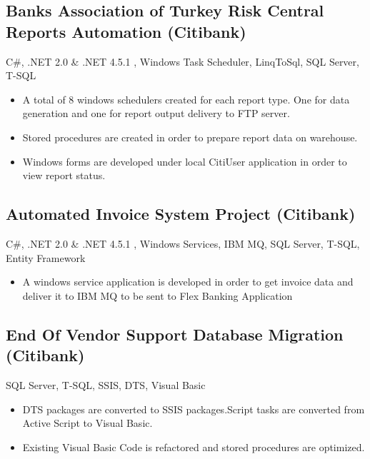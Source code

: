 \documentclass[1pt,a4paper,verdana]{moderncv} %
\begin{document}
\subsection{Banks Association of Turkey Risk Central Reports Automation (Citibank)}
 {C\#, .NET 2.0 \& .NET 4.5.1 , Windows Task Scheduler, LinqToSql, SQL Server, T-SQL}
 {\begin{itemize}
		\item A total of 8 windows schedulers created for each report type. One for data generation and one for report output delivery to FTP server.
		\item Stored procedures are created in order to prepare report data on warehouse.
		\item Windows forms are developed under local CitiUser application in order to view report status.
\end{itemize}}

\subsection{Automated Invoice System Project (Citibank)}
 {C\#, .NET 2.0 \& .NET 4.5.1 , Windows Services, IBM MQ, SQL Server, T-SQL, Entity Framework}
 {\begin{itemize}
		\item A windows service application is developed in order to get invoice data and deliver it to IBM MQ to be sent to Flex Banking Application		
\end{itemize}}

\subsection{End Of Vendor Support Database Migration (Citibank)}
 {SQL Server, T-SQL, SSIS, DTS, Visual Basic}
 {\begin{itemize}
		\item DTS packages are converted to SSIS packages.Script tasks are converted from Active Script to Visual Basic.
		\item Existing Visual Basic Code is refactored and stored procedures are optimized.
\end{itemize}}
\end{document}
